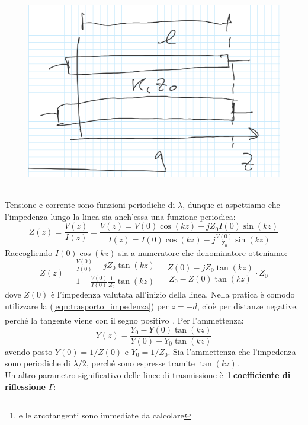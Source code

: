 \documentclass{book}
\begin{document}
        \begin{figure}[h!]
            \center  
            \includegraphics[width=0.75\linewidth]{Chapter_two/Chapt2img4.png}
        \end{figure}
        \\
        Tensione e corrente sono funzioni periodiche di $\lambda$, dunque ci aspettiamo che l'impedenza lungo la linea sia anch'essa 
        una funzione periodica:
        \begin{equation}
            Z(z) = \frac{V(z)}{I(z)} = \frac{\displaystyle V(z) = V(0)\cos(kz)-jZ_{0}I(0)\sin(kz)}{I(z) = I(0)\cos(kz)-\displaystyle j\frac{V(0)}{Z_{0}}\sin(kz)}
        \end{equation}
        Raccogliendo $I(0)\cos(kz)$ sia a numeratore che denominatore otteniamo:
        \begin{equation}
            \label{eqn:trasporto_impedenza}
            Z(z)=\displaystyle \frac{\displaystyle \frac{V(0)}{I(0)}-jZ_{0}\tan(kz)}{1-\displaystyle \frac{V(0)}{I(0)}\frac{1}{Z_{0}}\tan(kz)} = 
            \frac{Z(0)-jZ_{0}\tan(kz)}{\displaystyle Z_{0}-Z(0)\tan(kz)}\cdot Z_{0}
        \end{equation}
        dove $Z(0)$ è l'impedenza valutata all'inizio della linea. Nella pratica è comodo utilizzare la
        (\ref{eqn:trasporto_impedenza}) per $z=-d$, cioè per distanze negative, perché la tangente viene con il segno positivo\footnote{e le arcotangenti sono immediate da calcolare}.
        Per l'ammettenza:
        \begin{equation}
            Y(z)=\frac{Y_{0}-Y(0)\tan(kz)}{Y(0)-Y_{0}\tan(kz)}
        \end{equation}
        avendo posto $Y(0)=1/Z(0)$ e $Y_{0}=1/Z_{0}$. Sia l'ammettenza che l'impedenza sono periodiche di $\lambda/2$, perché
        sono espresse tramite $\tan(kz)$. \\
        Un altro parametro significativo delle linee di trasmissione è il \textbf{coefficiente di riflessione} $\Gamma$:
\end{document}
